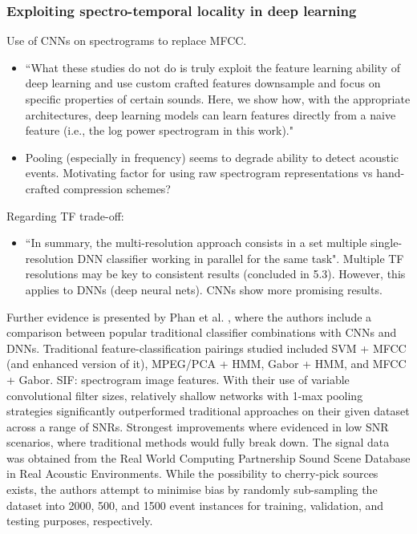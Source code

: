 \documentclass[12pt]{llncs}
\begin{document}
\subsubsection*{Exploiting spectro-temporal locality in deep learning \cite{espi2015exploiting}}
Use of CNNs on spectrograms to replace MFCC.
\begin{itemize}
	\item  ``What these studies do not do is truly exploit the feature learning ability of deep learning and use custom crafted features downsample and focus on specific properties of certain sounds. Here, we show how, with the appropriate architectures, deep learning models can learn features directly from a naive feature (i.e., the log power spectrogram in this work)."
	\item Pooling (especially in frequency) seems to degrade ability to detect acoustic events. Motivating factor for using raw spectrogram representations vs hand-crafted compression schemes?
\end{itemize}
Regarding TF trade-off:
\begin{itemize}
	\item ``In summary, the multi-resolution approach consists in a set multiple single-resolution DNN classifier working in parallel for the same task". Multiple TF resolutions may be key to consistent results (concluded in 5.3). However, this applies to DNNs (deep neural nets). CNNs show more promising results.
\end{itemize}

Further evidence is presented by Phan et al. \cite{phan2016robust}, where the authors include a comparison between popular traditional classifier combinations with CNNs and DNNs. Traditional feature-classification pairings studied included SVM + MFCC (and enhanced version of it), MPEG/PCA + HMM, Gabor + HMM, and MFCC + Gabor. SIF: spectrogram image features. With their use of variable convolutional filter sizes, relatively shallow networks with  1-max pooling strategies significantly outperformed traditional approaches on their given dataset across a range of SNRs. Strongest improvements where evidenced in low SNR scenarios, where traditional methods would fully break down. The signal data was obtained from the Real World Computing Partnership Sound Scene Database in Real Acoustic Environments. While the possibility to cherry-pick sources exists, the authors attempt to minimise bias by randomly sub-sampling the dataset into  2000, 500, and 1500 event instances for training, validation, and testing purposes, respectively. 
\end{document}

